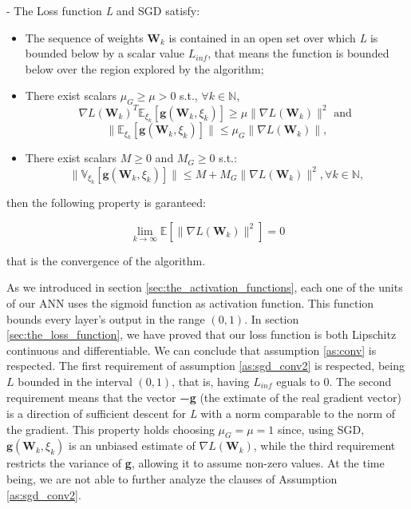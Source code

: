 		\begin{asu} - \label{as:sgd_conv2}
				The Loss function \textit{L} and SGD satisfy:

				\begin{itemize}
					\item The sequence of weights ${\textbf{W}_k}$ is contained in an open set over which \textit{L} is bounded below by a scalar value $\textit{L}_{inf}$, that means the function is bounded below over the region explored by the algorithm;
					\item There exist scalars $\mu_G \geq \mu > 0 $ s.t., $\forall k \in \mathbb{N}$,
						\begin{equation}
							\nabla\textit{L}(\textbf{W}_k)^T\mathbb{E}_{\xi_k}[\textbf{g}(\textbf{W}_k,\xi_k)] \geq \mu \|\nabla\textit{L}(\textbf{W}_k)\|^2 \text{ and }
						\end{equation}
						\begin{equation}
							\|\mathbb{E}_{\xi_k}[\textbf{g}(\textbf{W}_k,\xi_k)]\|\leq \mu_G \|\nabla\textit{L}(\textbf{W}_k)\|,
						\end{equation}
					\item There exist scalars $M \geq 0 $ and $M_G \geq 0 $ s.t.:
						\begin{equation}
							\|\mathbb{V}_{\xi_k}[\textbf{g}(\textbf{W}_k,\xi_k)]\|\leq M + M_G\|\nabla\textit{L}(\textbf{W}_k)\|^2, \forall  k \in \mathbb{N},
						\end{equation}
				\end{itemize}

		\end{asu}

		then the following property is garanteed:

			\begin{equation*}
			     \lim_{k\to\infty}\mathbb{E}[\|\nabla\textit{L}(\textbf{W}_k)\|^2] = 0
			\end{equation*}

		that is the convergence of the algorithm.

		As we introduced in section \ref{sec:the_activation_functions}, each one of the units of our ANN uses
		the sigmoid function as activation function. This function bounds every layer's output in the range
		$(0, 1)$. In section \ref{sec:the_loss_function}, we have proved that our loss function is both
		Lipschitz continuous and differentiable. We can conclude that assumption \ref{as:conv} is respected.
		The first requirement of assumption \ref{as:sgd_conv2} is respected, being $L$ bounded in the
		interval $(0, 1)$, that is, having $L_{\mathit{inf}}$ eguals to $0$. The second requirement
		means that the vector \textbf{−g} (the extimate of the real gradient vector) is a direction of
		sufficient descent for \textit{L} with a norm comparable to the norm of the gradient. This property holds choosing $\mu_G = \mu = 1$ since, using SGD, $\textbf{g}(\textbf{W}_k, \xi_k)$ is an unbiased estimate of $\nabla L(\textbf{W}_k)$, while the
		third requirement restricts the variance of \textbf{g}, allowing it to assume non-zero values.
		At the time being, we are not able to further analyze the clauses of Assumption \ref{as:sgd_conv2}.

